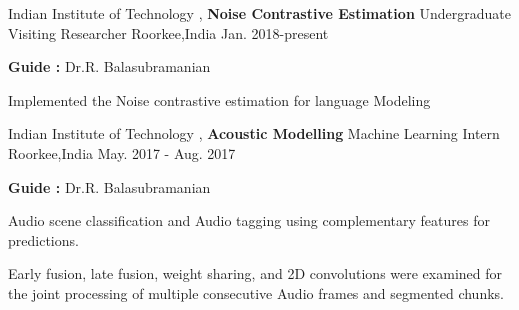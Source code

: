 \begin{cventries}
\cventry
    {Indian Institute of Technology , \textbf{Noise Contrastive Estimation}}
    {Undergraduate Visiting Researcher}
    {Roorkee,India}
    {Jan. 2018-present}
    {
      \begin{cvitems}
         \item {\textbf{Guide :} Dr.R. Balasubramanian}
          \item {Implemented the Noise contrastive estimation for language Modeling}
      \end{cvitems}
    }
\cventry
    {Indian Institute of Technology , \textbf{Acoustic Modelling}}
    {Machine Learning Intern}
    {Roorkee,India}
    {May. 2017 - Aug. 2017}
    {
      \begin{cvitems}
       \item {\textbf{Guide :} Dr.R. Balasubramanian}
        \item {Audio scene classification and Audio tagging using complementary features for predictions.}
          \item {Early fusion, late fusion, weight sharing, and 2D convolutions were examined for the joint processing of multiple consecutive Audio frames and segmented chunks.}
      \end{cvitems}
    }
 
    
\end{cventries}
